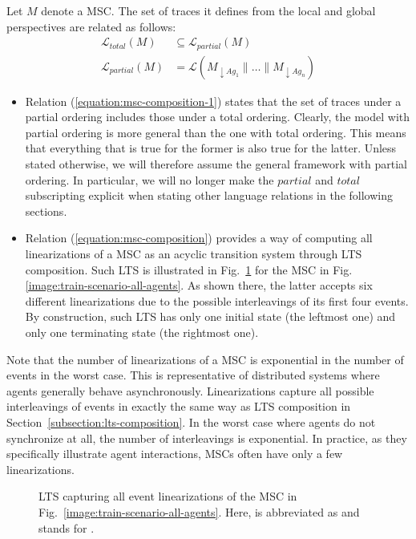 Let $M$ denote a MSC. The set of traces it defines from the local and global perspectives are related as follows:
\begin{align}
\mathcal{L}_{total}(M) & \subseteq \mathcal{L}_{partial}(M) 
\label{equation:msc-composition-1} \\
\mathcal{L}_{partial}(M) &= \mathcal{L}(M_{\downarrow Ag_1} \parallel \ldots \parallel M_{\downarrow Ag_n})
\label{equation:msc-composition}
\end{align}

\begin{itemize}
\item Relation (\ref{equation:msc-composition-1}) states that the set of traces under a partial ordering includes those under a total ordering. Clearly, the model with partial ordering is more general than the one with total ordering. This means that everything that is true for the former is also true for the latter. Unless stated otherwise, we will therefore assume the general framework with partial ordering. In particular, we will no longer make the $partial$ and $total$ subscripting explicit when stating other language relations in the following sections.

\item Relation (\ref{equation:msc-composition}) provides a way of computing all linearizations of a MSC as an acyclic transition system through LTS composition. Such LTS is illustrated in Fig.~\ref{image:msc-linearizations} for the MSC in Fig.\ref{image:train-scenario-all-agents}. As shown there, the latter accepts six different linearizations due to the possible interleavings of its first four events. By construction, such LTS has only one initial state (the leftmost one) and only one terminating state (the rightmost one).
\end{itemize}

Note that the number of linearizations of a MSC is exponential in the number of events in the worst case. This is representative of distributed systems where agents generally behave asynchronously. Linearizations capture all possible interleavings of events in exactly the same way as LTS composition in Section~\ref{subsection:lts-composition}. In the worst case where agents do not synchronize at all, the number of interleavings is exponential. In practice, as they specifically illustrate agent interactions, MSCs often have only a few linearizations.

\begin{figure}\centering
{}
\caption{LTS capturing all event linearizations of the MSC in Fig.~\ref{image:train-scenario-all-agents}. Here,  is abbreviated as  and  stands for . \label{image:msc-linearizations}}
\end{figure}

